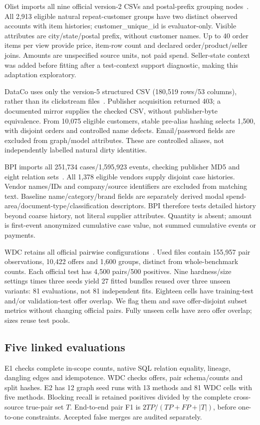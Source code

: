 \documentclass[conference,letterpaper]{IEEEtran}
\begin{document}
Olist imports all nine official version-2 CSVs and postal-prefix grouping nodes~\cite{olist}. All 2,913 eligible natural repeat-customer groups have two distinct observed accounts with item histories; customer\_unique\_id is evaluator-only. Visible attributes are city/state/postal prefix, without customer names. Up to 40 order items per view provide price, item-row count and declared order/product/seller joins. Amounts are unspecified source units, not paid spend. Seller-state context was added before fitting after a test-context support diagnostic, making this adaptation exploratory.

DataCo uses only the version-5 structured CSV (180,519 rows/53 columns), rather than its clickstream files~\cite{dataco}. Publisher acquisition returned 403; a documented mirror supplies the checked CSV, without publisher-byte equivalence. From 10,075 eligible customers, stable pre-alias hashing selects 1,500, with disjoint orders and controlled name defects. Email/password fields are excluded from graph/model attributes. These are controlled aliases, not independently labelled natural dirty identities.

BPI imports all 251,734 cases/1,595,923 events, checking publisher MD5 and eight relation sets~\cite{bpi}. All 1,378 eligible vendors supply disjoint case histories. Vendor names/IDs and company/source identifiers are excluded from matching text. Baseline name/category/brand fields are separately derived modal spend-area/document-type/classification descriptors. BPI therefore tests detailed history beyond coarse history, not literal supplier attributes. Quantity is absent; amount is first-event anonymized cumulative case value, not summed cumulative events or payments.

WDC retains all official pairwise configurations~\cite{wdc,wdcsite}. Used files contain 155,957 pair observations, 10,422 offers and 1,600 groups, distinct from whole-benchmark counts. Each official test has 4,500 pairs/500 positives. Nine hardness/size settings times three seeds yield 27 fitted bundles reused over three unseen variants: 81 evaluations, not 81 independent fits. Eighteen cells have training-test and/or validation-test offer overlap. We flag them and save offer-disjoint subset metrics without changing official pairs. Fully unseen cells have zero offer overlap; sizes reuse test pools.

\subsection{Five linked evaluations}
E1 checks complete in-scope counts, native SQL relation equality, lineage, dangling edges and idempotence. WDC checks offers, pair schema/counts and split hashes. E2 has 12 graph seed runs with 13 methods and 81 WDC cells with five methods. Blocking recall is retained positives divided by the complete cross-source true-pair set $T$. End-to-end pair F1 is $2TP/(TP+FP+|T|)$, before one-to-one constraints. Accepted false merges are audited separately.
\end{document}
